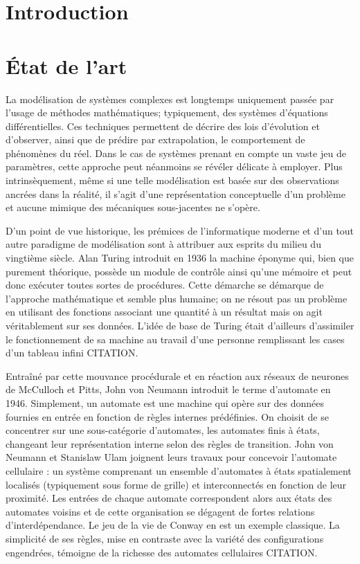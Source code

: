 \documentclass[10pt]{article}
\begin{document}
\begin{multicols}{2}

\section{Introduction}

\section{\'Etat de l'art}

La modélisation de systèmes complexes est longtemps uniquement passée
par l'usage de méthodes mathématiques; typiquement, des systèmes
d'équations différentielles. Ces techniques permettent de décrire des
lois d'évolution et d'observer, ainsi que de prédire par
extrapolation, le comportement de phénomènes du réel. Dans le cas de
systèmes prenant en compte un vaste jeu de paramètres, cette approche
peut néanmoins se révéler délicate à employer. Plus intrinsèquement,
même si une telle modélisation est basée sur des observations ancrées
dans la réalité, il s'agit d'une représentation conceptuelle d'un
problème et aucune mimique des mécaniques sous-jacentes ne s'opère.

D'un point de vue historique, les prémices de l'informatique moderne
et d'un tout autre paradigme de modélisation sont à attribuer aux
esprits du milieu du vingtième siècle. Alan Turing introduit en 1936
la machine éponyme qui, bien que purement théorique, possède un module
de contrôle ainsi qu'une mémoire et peut donc exécuter toutes sortes
de procédures. Cette démarche se démarque de l'approche mathématique
et semble plus humaine; on ne résout pas un problème en utilisant des
fonctions associant une quantité à un résultat mais on agit
véritablement sur ses données. L'idée de base de Turing était
d'ailleurs d'assimiler le fonctionnement de sa machine au travail
d'une personne remplissant les cases d'un tableau infini CITATION.

Entraîné par cette mouvance procédurale et en réaction aux réseaux de
neurones de McCulloch et Pitts, John von Neumann introduit le terme
d'automate en 1946. Simplement, un automate est une machine qui opère
sur des données fournies en entrée en fonction de règles internes
prédéfinies. On choisit de se concentrer sur une sous-catégorie
d'automates, les automates finis à états, changeant leur
représentation interne selon des règles de transition. John von
Neumann et Stanislaw Ulam joignent leurs travaux pour concevoir
l'automate cellulaire : un système comprenant un ensemble d'automates
à états spatialement localisés (typiquement sous forme de grille) et
interconnectés en fonction de leur proximité. Les entrées de chaque
automate correspondent alors aux états des automates voisins et de
cette organisation se dégagent de fortes relations
d'interdépendance. Le jeu de la vie de Conway en est un exemple
classique. La simplicité de ses règles, mise en contraste avec la
variété des configurations engendrées, témoigne de la richesse des
automates cellulaires CITATION.


\end{multicols}
\end{document}
